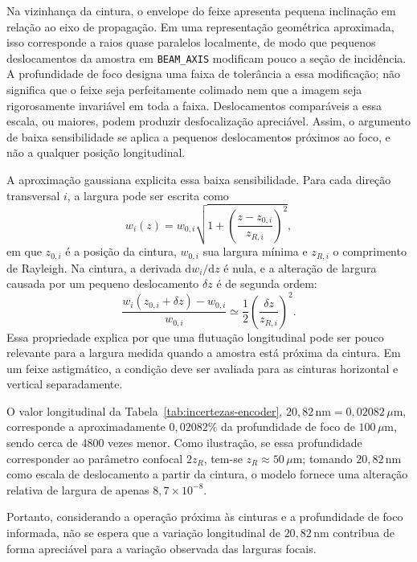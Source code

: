 \documentclass[12pt,a4paper]{article}
\begin{document}
Na vizinhança da cintura, o envelope do feixe apresenta pequena inclinação em relação ao eixo de propagação. Em uma representação geométrica aproximada, isso corresponde a raios quase paralelos localmente, de modo que pequenos deslocamentos da amostra em \texttt{BEAM\_AXIS} modificam pouco a seção de incidência. A profundidade de foco designa uma faixa de tolerância a essa modificação; não significa que o feixe seja perfeitamente colimado nem que a imagem seja rigorosamente invariável em toda a faixa. Deslocamentos comparáveis a essa escala, ou maiores, podem produzir desfocalização apreciável. Assim, o argumento de baixa sensibilidade se aplica a pequenos deslocamentos próximos ao foco, e não a qualquer posição longitudinal.

A aproximação gaussiana explicita essa baixa sensibilidade. Para cada direção transversal $i$, a largura pode ser escrita como \cite{newport_gaussian_beam_optics}
\begin{equation}
    w_i(z)=w_{0,i}\sqrt{1+\left(\frac{z-z_{0,i}}{z_{R,i}}\right)^2},
\end{equation}
em que $z_{0,i}$ é a posição da cintura, $w_{0,i}$ sua largura mínima e $z_{R,i}$ o comprimento de Rayleigh. Na cintura, a derivada $\mathrm{d}w_i/\mathrm{d}z$ é nula, e a alteração de largura causada por um pequeno deslocamento $\delta z$ é de segunda ordem:
\begin{equation}
    \frac{w_i(z_{0,i}+\delta z)-w_{0,i}}{w_{0,i}}
    \simeq \frac{1}{2}\left(\frac{\delta z}{z_{R,i}}\right)^2.
\end{equation}
Essa propriedade explica por que uma flutuação longitudinal pode ser pouco relevante para a largura medida quando a amostra está próxima da cintura. Em um feixe astigmático, a condição deve ser avaliada para as cinturas horizontal e vertical separadamente.

O valor longitudinal da Tabela~\ref{tab:incertezas-encoder}, $20{,}82\,\mathrm{nm}=0{,}02082\,\mu\mathrm{m}$, corresponde a aproximadamente $0{,}02082\%$ da profundidade de foco de $100\,\mu\mathrm{m}$, sendo cerca de 4800 vezes menor. Como ilustração, se essa profundidade corresponder ao parâmetro confocal $2z_R$, tem-se $z_R\approx50\,\mu\mathrm{m}$; tomando $20{,}82\,\mathrm{nm}$ como escala de deslocamento a partir da cintura, o modelo fornece uma alteração relativa de largura de apenas $8{,}7\times10^{-8}$.

Portanto, considerando a operação próxima às cinturas e a profundidade de foco informada, não se espera que a variação longitudinal de $20{,}82\,\mathrm{nm}$ contribua de forma apreciável para a variação observada das larguras focais.
\end{document}

